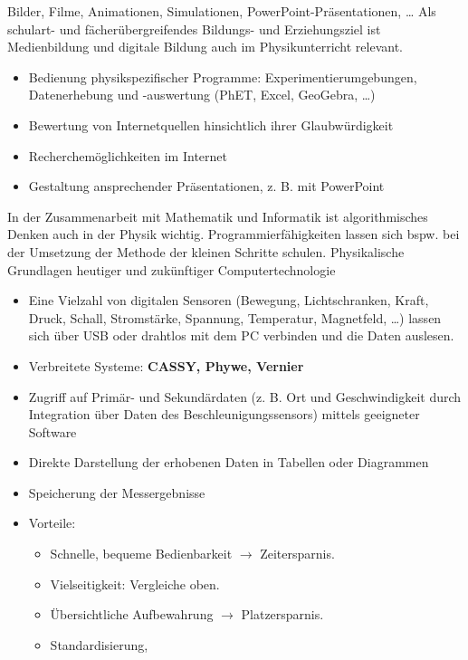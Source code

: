 \begin{itemize}
	 Bilder, Filme, Animationen, Simulationen, PowerPoint-Präsentationen, \dots
	 Als schulart- und fächerübergreifendes Bildungs- und Erziehungsziel ist Medienbildung und digitale Bildung auch im Physikunterricht relevant.
	\begin{itemize}
		\item Bedienung physikspezifischer Programme: Experimentierumgebungen, Datenerhebung und -auswertung (PhET, Excel, GeoGebra, \dots)
		\item Bewertung von Internetquellen hinsichtlich ihrer Glaubwürdigkeit
		\item Recherchemöglichkeiten im Internet
		\item Gestaltung ansprechender Präsentationen, z. B. mit PowerPoint
	\end{itemize}
	 In der Zusammenarbeit mit Mathematik und Informatik ist algorithmisches Denken auch in der Physik wichtig. Programmierfähigkeiten lassen sich bspw. bei der Umsetzung der Methode der kleinen Schritte schulen.
	 Physikalische Grundlagen heutiger und zukünftiger Computertechnologie
	\begin{itemize}
		\item Eine Vielzahl von digitalen Sensoren (Bewegung, Lichtschranken, Kraft, Druck, Schall, Stromstärke, Spannung, Temperatur, Magnetfeld, \dots) lassen sich über USB oder drahtlos mit dem PC verbinden und die Daten auslesen.
		\item Verbreitete Systeme: \textbf{CASSY, Phywe, Vernier}
		\item Zugriff auf Primär- und Sekundärdaten (z. B. Ort und Geschwindigkeit durch Integration über Daten des Beschleunigungssensors) mittels geeigneter Software
		\item Direkte Darstellung der erhobenen Daten in Tabellen oder Diagrammen
		\item Speicherung der Messergebnisse
		\item Vorteile:
			\begin{itemize}
				\item Schnelle, bequeme Bedienbarkeit $\to$ Zeitersparnis.
				\item Vielseitigkeit: Vergleiche oben.
				\item \"{U}bersichtliche Aufbewahrung $\to$ Platzersparnis.
				\item Standardisierung,

\end{itemize}
\end{itemize}
\end{itemize}
